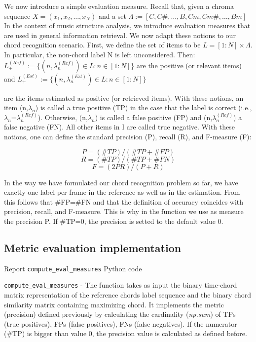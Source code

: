 \documentclass[
	12pt, %
]{fphw}
\begin{document}
We now introduce a simple evaluation measure. Recall that, given a chroma sequence \(X=(x_1,x_2,…,x_N)\) and a set \( \Lambda :=[C,C\#,…,B,Cm,Cm\#,…,Bm] \)\\

In the context of music structure analysis, we introduce evaluation measures that are used in general information retrieval. We now adapt these notions to our chord recognition scenario. First, we define the set of items to be $L=[1:N] \times \Lambda$. In particular, the non-chord label N is left unconsidered. Then:
$L_+^(Ref) := \{(n,\lambda_n^(Ref)) \in L:n\in[1:N]\}$ are the positive (or relevant items) and $L_+^(Est) :=\{(n,\lambda_n^(Est)) \in L:n\in[1:N]\}$

are the items estimated as positive (or retrieved items). With these notions, an item (n,$\lambda_n$) is called a true positive (TP) in the case that the label is correct (i.e., $\lambda_n$=$\lambda_n^(Ref)$). Otherwise, (n,$\lambda_n$) is called a false positive (FP) and (n,$\lambda_n^(Ref)$) a false negative (FN). All other items in I are called true negative. With these notions, one can define the standard precision (P), recall (R), and F-measure (F):

\[P=(\#TP)/(\#TP + \#FP)\]
\[R=(\#TP)/(\#TP + \#FN)\]
\[F=(2PR)/(P + R)\]

In the way we have formulated our chord recognition problem so far, we have exactly one label per frame in the reference as well as in the estimation. From this follows that \#FP=\#FN and that the definition of accuracy coincides with precision, recall, and F-measure. This is why in the function we use as measure the precision P. If \#TP=0, the precision is setted to the default value 0.

\subsection*{Metric evaluation implementation}

\color{red}Report \verb|compute_eval_measures| Python code\color{black}

\verb|compute_eval_measures| - The function takes as input the binary time-chord matrix representation of the reference chords label sequence and the binary chord similarity matrix containing maximizing chord.
It implements the metric (precision) defined previously by calculating the cardinality (\textit{np.sum}) of TPs (true positives), FPs (false positives), FNs (false negatives). If the numerator (\#TP) is bigger than value 0, the precision value is calculated as defined before.
\end{document}
